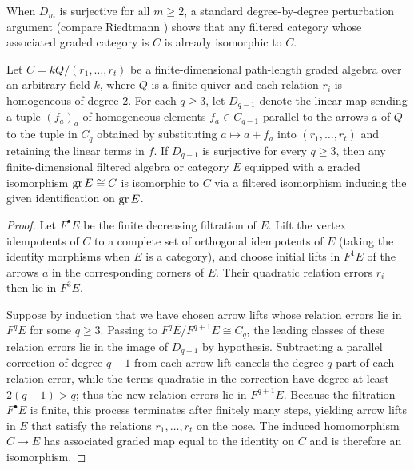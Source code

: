 When $D_m$ is surjective for all $m\geq2$, a standard degree-by-degree
perturbation argument (compare Riedtmann \cite[Section~3.3]{Riedtmann1984})
shows that any filtered category whose associated graded category is $C$ is
already isomorphic to $C$.

\begin{proposition}
\label{prop:filtered-normal-form}
Let $C=kQ/(r_1,\ldots,r_t)$ be a finite-dimensional path-length graded
algebra over an arbitrary field $k$, where $Q$ is a finite quiver and each
relation $r_i$ is homogeneous of degree $2$. For each $q\geq3$, let
$D_{q-1}$ denote the linear map sending a tuple $(f_a)_a$ of homogeneous
elements $f_a\in C_{q-1}$ parallel to the arrows $a$ of $Q$ to the tuple in
$C_q$ obtained by substituting $a\mapsto a+f_a$ into $(r_1,\ldots,r_t)$ and
retaining the linear terms in $f$. If $D_{q-1}$ is surjective for every
$q\geq3$, then any finite-dimensional filtered algebra or category $E$
equipped with a graded isomorphism $\operatorname{gr} E\cong C$ is isomorphic to $C$ via a
filtered isomorphism inducing the given identification on $\operatorname{gr} E$.
\end{proposition}
\begin{proof}
Let $F^\bullet E$ be the finite decreasing filtration of $E$. Lift the vertex
idempotents of $C$ to a complete set of orthogonal idempotents of $E$ (taking
the identity morphisms when $E$ is a category), and choose initial lifts in
$F^1 E$ of the arrows $a$ in the corresponding corners of $E$. Their
quadratic relation errors $r_i$ then lie in $F^3 E$.

Suppose by induction that we have chosen arrow lifts whose relation errors
lie in $F^q E$ for some $q\geq3$. Passing to $F^q E/F^{q+1}E\cong C_q$, the
leading classes of these relation errors lie in the image of $D_{q-1}$ by
hypothesis. Subtracting a parallel correction of degree $q-1$ from each arrow
lift cancels the degree-$q$ part of each relation error, while the terms
quadratic in the correction have degree at least $2(q-1)>q$; thus the new
relation errors lie in $F^{q+1}E$. Because the filtration $F^\bullet E$ is
finite, this process terminates after finitely many steps, yielding arrow
lifts in $E$ that satisfy the relations $r_1,\ldots,r_t$ on the nose. The
induced homomorphism $C\to E$ has associated graded map equal to the identity
on $C$ and is therefore an isomorphism.
\end{proof}

